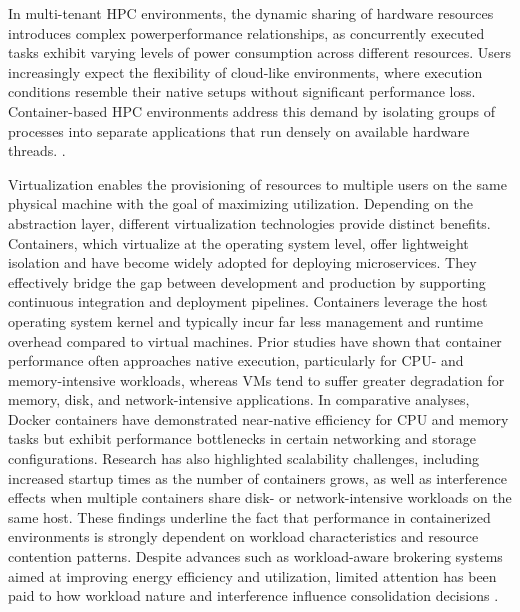In multi-tenant HPC environments, the dynamic sharing of hardware resources introduces complex powerperformance relationships, as concurrently executed tasks exhibit varying levels of power consumption across different resources. Users increasingly expect the flexibility of cloud-like environments, where execution conditions resemble their native setups without significant performance loss. Container-based HPC environments address this demand by isolating groups of processes into separate applications that run densely on available hardware threads. \cite{Kuity_2023}.

Virtualization enables the provisioning of resources to multiple users on the same physical machine with the goal of maximizing utilization. Depending on the abstraction layer, different virtualization technologies provide distinct benefits. Containers, which virtualize at the operating system level, offer lightweight isolation and have become widely adopted for deploying microservices. They effectively bridge the gap between development and production by supporting continuous integration and deployment pipelines.
Containers leverage the host operating system kernel and typically incur far less management and runtime overhead compared to virtual machines. Prior studies have shown that container performance often approaches native execution, particularly for CPU- and memory-intensive workloads, whereas VMs tend to suffer greater degradation for memory, disk, and network-intensive applications. In comparative analyses, Docker containers have demonstrated near-native efficiency for CPU and memory tasks but exhibit performance bottlenecks in certain networking and storage configurations. Research has also highlighted scalability challenges, including increased startup times as the number of containers grows, as well as interference effects when multiple containers share disk- or network-intensive workloads on the same host. These findings underline the fact that performance in containerized environments is strongly dependent on workload characteristics and resource contention patterns. Despite advances such as workload-aware brokering systems aimed at improving energy efficiency and utilization, limited attention has been paid to how workload nature and interference influence consolidation decisions \cite{8397647}.

